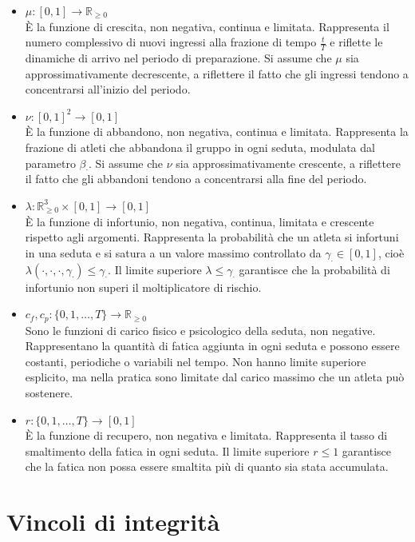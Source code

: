 \begin{itemize}
    \item $\mu : [0, 1] \longrightarrow \mathbb{R}_{\geq 0}$ \\
        È la funzione di crescita, non negativa, continua e limitata. Rappresenta il numero complessivo di nuovi ingressi alla frazione di tempo $\frac{t}{T}$ e riflette le dinamiche di arrivo nel periodo di preparazione. Si assume che $\mu$ sia approssimativamente decrescente, a riflettere il fatto che gli ingressi tendono a concentrarsi all'inizio del periodo.
    \item $\nu : {[0, 1]}^2 \longrightarrow [0, 1]$ \\
        È la funzione di abbandono, non negativa, continua e limitata. Rappresenta la frazione di atleti che abbandona il gruppo in ogni seduta, modulata dal parametro $\beta_\cdot$. Si assume che $\nu$ sia approssimativamente crescente, a riflettere il fatto che gli abbandoni tendono a concentrarsi alla fine del periodo.
    \item $\lambda : \mathbb{R}_{\geq 0}^3 \times [0, 1] \longrightarrow [0, 1]$ \\
        È la funzione di infortunio, non negativa, continua, limitata e crescente rispetto agli argomenti. Rappresenta la probabilità che un atleta si infortuni in una seduta e si satura a un valore massimo controllato da $\gamma_\cdot \in [0, 1]$, cioè $\lambda(\cdot, \cdot, \cdot, \gamma_\cdot) \leq \gamma_\cdot$. Il limite superiore $\lambda \leq \gamma_\cdot$ garantisce che la probabilità di infortunio non superi il moltiplicatore di rischio.
    \item $c_f, c_p : \{0, 1, \dots, T\} \longrightarrow \mathbb{R}_{\geq 0}$ \\
        Sono le funzioni di carico fisico e psicologico della seduta, non negative. Rappresentano la quantità di fatica aggiunta in ogni seduta e possono essere costanti, periodiche o variabili nel tempo. Non hanno limite superiore esplicito, ma nella pratica sono limitate dal carico massimo che un atleta può sostenere.
    \item $r : \{0, 1, \dots, T\} \longrightarrow [0, 1]$ \\
        È la funzione di recupero, non negativa e limitata. Rappresenta il tasso di smaltimento della fatica in ogni seduta. Il limite superiore $r \leq 1$ garantisce che la fatica non possa essere smaltita più di quanto sia stata accumulata.
\end{itemize}

\section{Vincoli di integrità}

